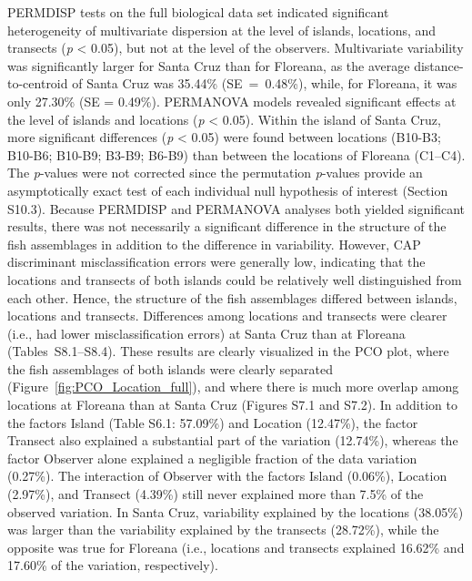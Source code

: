 \documentclass[jmse,article,accept,moreauthors,pdftex]{Definitions/mdpi}
\begin{document}
PERMDISP tests on the full biological data set indicated significant heterogeneity of multivariate dispersion at the level of islands, locations, and transects (\textit{p} < 0.05), but not at the level of the observers. Multivariate variability was significantly larger for Santa Cruz than for Floreana, as the average distance-to-centroid of Santa Cruz was \mbox{35.44\%} \mbox{(SE = 0.48\%)}, while, for Floreana, it was only 27.30\% (SE = 0.49\%). PERMANOVA models revealed significant effects at the level of islands and locations (\textit{p} < 0.05). Within the island of Santa Cruz, more significant differences (\textit{p} < 0.05) were found between locations (B10-B3; B10-B6; B10-B9; B3-B9; B6-B9) than between the locations of Floreana (C1--C4). The \textit{p}-values were not corrected since the permutation \textit{p}-values provide an asymptotically exact test of each individual null hypothesis of interest \citep{Anderson2008PERMANOVA+Methods} (Section S10.3). %
Because PERMDISP and PERMANOVA analyses both yielded significant results, there was not necessarily a significant difference in the structure of the fish assemblages in addition to the difference in variability. However, CAP discriminant misclassification errors were generally low, indicating that the locations and transects of both islands could be relatively well distinguished from each other. Hence, the structure of the fish assemblages differed between islands, locations and transects. Differences among locations and transects were clearer (i.e., had lower misclassification errors) at Santa Cruz than at Floreana \mbox{(Tables S8.1--S8.4)}. These results are clearly visualized in the PCO plot, where the fish assemblages of both islands were clearly separated \mbox{(Figure \ref{fig:PCO_Location_full})}, and where there is much more overlap among locations at Floreana than at Santa Cruz (Figures S7.1 and S7.2). In addition to the factors Island (Table S6.1: 57.09\%) and Location (12.47\%), the factor Transect also explained a substantial part of the variation (12.74\%), whereas the factor Observer alone explained a negligible fraction of the data variation (0.27\%). The interaction of Observer with the factors Island \mbox{(0.06\%)}, Location (2.97\%), and Transect (4.39\%) still never explained more than 7.5\% of the observed variation. In Santa Cruz, variability explained by the locations (38.05\%) was larger than the variability explained by the transects (28.72\%), while the opposite was true for Floreana (i.e., locations and transects explained 16.62\% and 17.60\% of the variation, respectively). 
\end{document}

